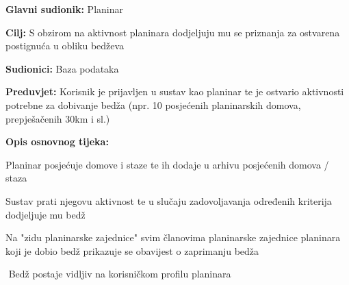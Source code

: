 		\noindent {}
	\begin{packed_item}
		
		\item \textbf{Glavni sudionik: }$ $Planinar$ $
		\item  \textbf{Cilj:} $ $S obzirom na aktivnost planinara dodjeljuju mu se priznanja za ostvarena postignuća u obliku bedževa$ $
		\item  \textbf{Sudionici:} $ $Baza podataka$ $
		\item  \textbf{Preduvjet:} $ $Korisnik je prijavljen u sustav kao planinar te je ostvario aktivnosti potrebne za dobivanje bedža (npr. 10 posjećenih planinarskih domova, prepješačenih 30km i sl.)$ $
		\item  \textbf{Opis osnovnog tijeka:}
		
		\item[] \begin{packed_enum}
			
			\item $ $Planinar posjećuje domove i staze te ih dodaje u arhivu posjećenih domova / staza$ $
			\item $ $Sustav prati njegovu aktivnost te u slučaju zadovoljavanja određenih kriterija dodjeljuje mu bedž$ $
			\item $ $Na "zidu planinarske zajednice" svim članovima planinarske zajednice planinara koji je dobio bedž prikazuje se obavijest o zaprimanju bedža$ $
			\item $ $ Bedž postaje vidljiv na korisničkom profilu planinara$ $
		\end{packed_enum}
	\end{packed_item}
					
